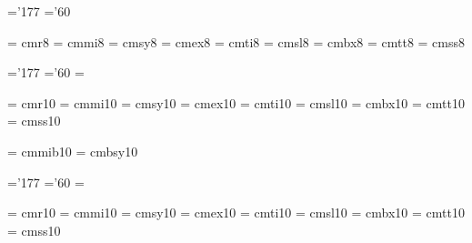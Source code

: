  
\skewchar\seven@mi ='177      %
\skewchar\seven@sy ='60       %
 
 
  \font\eight@rm  = cmr8      %
  \font\eight@mi  = cmmi8     %
  \font\eight@sy  = cmsy8     %
  \font\eight@ex  = cmex8     %
  \font\eight@it  = cmti8     %
  \font\eight@sl  = cmsl8     %
  \font\eight@bf  = cmbx8     %
  \font\eight@tt  = cmtt8     %
  \font\eight@ss  = cmss8     %
 
 
\skewchar\eight@mi ='177      %
\skewchar\eight@sy ='60       %
\hyphenchar\eight@tt = \m@ne  %
 
 
  \font\ten@rm  = cmr10     %
  \font\ten@mi  = cmmi10    %
  \font\ten@sy  = cmsy10    %
  \font\ten@ex  = cmex10    %
  \font\ten@it  = cmti10    %
  \font\ten@sl  = cmsl10    %
  \font\ten@bf  = cmbx10    %
  \font\ten@tt  = cmtt10    %
  \font\ten@ss  = cmss10    %
 
  \font\ten@mib = cmmib10   %
  \font\ten@syb = cmbsy10   %
 
\skewchar\ten@mi ='177      %
\skewchar\ten@sy ='60       %
\hyphenchar\ten@tt = \m@ne  %
 
 
  \font\ten@rm@  = cmr10     \@halfmag  %
  \font\ten@mi@  = cmmi10    \@halfmag  %
  \font\ten@sy@  = cmsy10    \@halfmag  %
  \font\ten@ex@  = cmex10    \@halfmag  %
  \font\ten@it@  = cmti10    \@halfmag  %
  \font\ten@sl@  = cmsl10    \@halfmag  %
  \font\ten@bf@  = cmbx10    \@halfmag  %
  \font\ten@tt@  = cmtt10    \@halfmag  %
  \font\ten@ss@  = cmss10    \@halfmag  %
 
